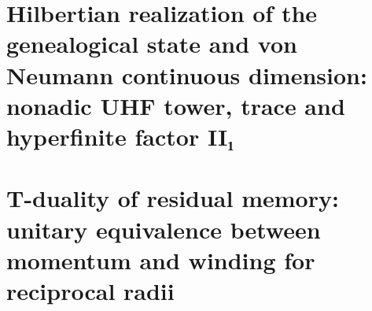 \chapter{Hilbertian realization of the genealogical state and von Neumann continuous dimension: nonadic UHF tower, trace and hyperfinite factor II₁}
\label{chap:sucesor-102-23}



















\chapter{T-duality of residual memory: unitary equivalence between momentum and winding for reciprocal radii}
\label{chap:sucesor-102-24}
\label{chap:dualidad-t-memoria-residual}

\begingroup
\newcount\HMTFZeroEightThreeSubsection
{}
\let\HMTFZeroEightThreeOriginalSubsection\subsection
\renewcommand{\subsection}[1]{%
  \advance\HMTFZeroEightThreeSubsection by 1
  \ifnum\HMTFZeroEightThreeSubsection=3
    \HMTFZeroEightThreeOriginalSubsection{Operatorial extension of APP: separation between visible modes and memory modes}%
  \else
    \HMTFZeroEightThreeOriginalSubsection{#1}%
  \fi
}

\endgroup













